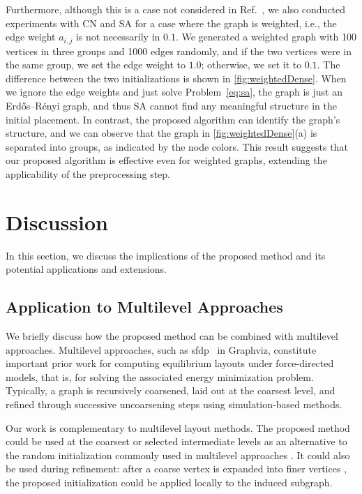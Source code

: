 \documentclass{jgaa-art}
\begin{document}
Furthermore, although this is a case not considered in Ref.~\citep{ghassemitoosiSimulatedAnnealingPreProcessing2016}, we also conducted experiments with \textsf{CN} and \textsf{SA} for a case where the graph is weighted, i.e., the edge weight $a_{i,j}$ is not necessarily in $\qty{0,1}$.
We generated a weighted graph with 100 vertices in three groups and 1000 edges randomly, and if the two vertices were in the same group, we set the edge weight to $1.0$; otherwise, we set it to $0.1$.
The difference between the two initializations is shown in \cref{fig:weightedDense}.
When we ignore the edge weights and just solve Problem~\eqref{eq:sa}, the graph is just an Erd\H{o}s--R\'enyi graph, and thus \textsf{SA} cannot find any meaningful structure in the initial placement.
In contrast, the proposed algorithm can identify the graph's structure, and we can observe that the graph in \cref{fig:weightedDense}(a) is separated into groups, as indicated by the node colors.
This result suggests that our proposed algorithm is effective even for weighted graphs, extending the applicability of the preprocessing step.


\section{Discussion}
\label{sec:discussion}

In this section, we discuss the implications of the proposed method and its potential applications and extensions.

\subsection{Application to Multilevel Approaches}
\label{sec:application_like_multilevel}

We briefly discuss how the proposed method can be combined with multilevel approaches.
Multilevel approaches, such as \textsf{sfdp}~\citep{Hu2006EfficientHF} in Graphviz, constitute important prior work for computing equilibrium layouts under force-directed models, that is, for solving the associated energy minimization problem.
Typically, a graph is recursively coarsened, laid out at the coarsest level, and refined through successive uncoarsening steps using simulation-based methods.


Our work is complementary to multilevel layout methods.
The proposed method could be used at the coarsest or selected intermediate levels as an alternative to the random initialization commonly used in multilevel approaches \citep{Hu2006EfficientHF,harelFastMultiScaleMethod2002}.
It could also be used during refinement: after a coarse vertex is expanded into finer vertices \citep{Hu2006EfficientHF,harelFastMultiScaleMethod2002}, the proposed initialization could be applied locally to the induced subgraph.
\end{document}
